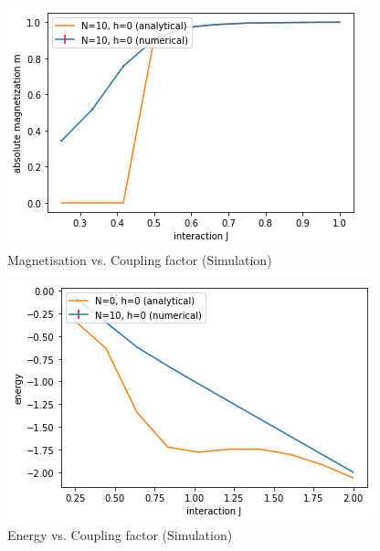 \documentclass{article}
\begin{document}
\begin{figure}[h!]
    \centering
    \includegraphics[width=.6\textwidth]{mag-int.png}
    \caption{Magnetisation vs. Coupling factor (Simulation)}
    \label{fig:mag-int}
\end{figure}
\begin{figure}[h!]
    \centering
    \includegraphics[width=.6\textwidth]{energy-int.png}
    \caption{Energy vs. Coupling factor (Simulation)}
    \label{fig:enrgy-int}
\end{figure}
\end{document}
